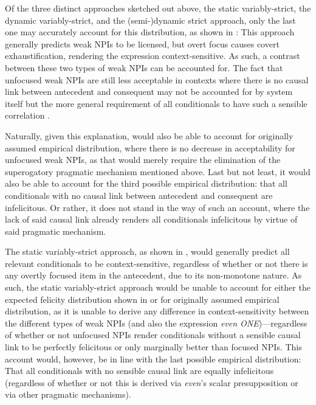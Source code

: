 \noindent Of the three distinct approaches sketched out above, the static variably-strict, the dynamic variably-strict, and the (semi-)dynamic strict approach, only the last one may accurately account for this distribution, as shown in : This approach generally predicts weak NPIs to be licensed, but overt focus causes covert exhaustification, rendering the expression context-sensitive. As such, a contrast between these two types of weak NPIs can be accounted for. The fact that unfocused weak NPIs are still less acceptable in contexts where there is no causal link between antecedent and consequent may not be accounted for by  system itself but the more general requirement of all conditionals to have such a sensible correlation \parencite{Douven2008,Schulz2011,Spohn2013,vanRooij2022}.

Naturally, given this explanation, \textcite{Fintel2001} would also be able to account for  originally assumed empirical distribution, where there is no decrease in acceptability for unfocused weak NPIs, as that would merely require the elimination of the superogatory pragmatic mechanism mentioned above. Last but not least, it would also be able to account for the third possible empirical distribution: that all conditionals with no causal link between antecedent and consequent are infelicitous. Or rather, it does not stand in the way of such an account, where the lack of said causal link already renders all conditionals infelicitous by virtue of said pragmatic mechanism.

The static variably-strict approach, as shown in , would generally predict all relevant conditionals to be context-sensitive, regardless of whether or not there is any overtly focused item in the antecedent, due to its non-monotone nature. As such, the static variably-strict approach would be unable to account for either the expected felicity distribution shown in  or for  originally assumed empirical distribution, as it is unable to derive any difference in context-sensitivity between the different types of weak NPIs (and also the expression \textit{even \MakeUppercase{one}})---regardless of whether or not unfocused NPIs render conditionals without a sensible causal link to be perfectly felicitous or only marginally better than focused NPIs. This account would, however, be in line with the last possible empirical distribution: That all conditionals with no sensible causal link are equally infelicitous (regardless of whether or not this is derived via \textit{even}'s scalar presupposition or via other pragmatic mechanisms).

